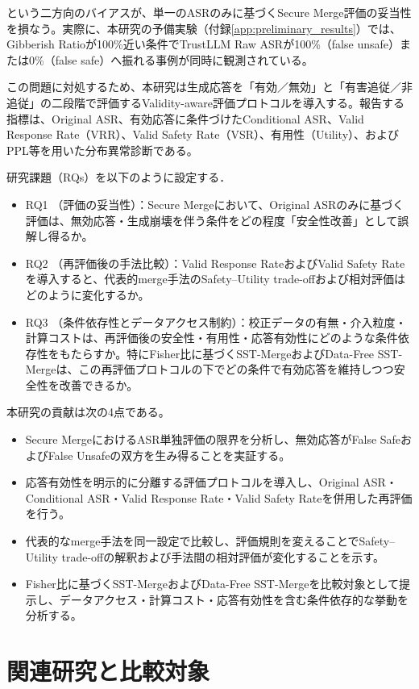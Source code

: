 \documentclass{article}
\begin{document}
という二方向のバイアスが、単一のASRのみに基づくSecure Merge評価の妥当性を損なう。実際に、本研究の予備実験（付録\ref{app:preliminary_results}）では、Gibberish Ratioが100\%近い条件でTrustLLM Raw ASRが100\%（false unsafe）または0\%（false safe）へ振れる事例が同時に観測されている。

この問題に対処するため、本研究は生成応答を「有効／無効」と「有害追従／非追従」の二段階で評価するValidity-aware評価プロトコルを導入する。報告する指標は、Original ASR、有効応答に条件づけたConditional ASR、Valid Response Rate（VRR）、Valid Safety Rate（VSR）、有用性（Utility）、およびPPL等を用いた分布異常診断である。

研究課題（RQs）を以下のように設定する．
\begin{itemize}
    \item RQ1 （評価の妥当性）：Secure Mergeにおいて、Original ASRのみに基づく評価は、無効応答・生成崩壊を伴う条件をどの程度「安全性改善」として誤解し得るか。
    \item RQ2 （再評価後の手法比較）：Valid Response RateおよびValid Safety Rateを導入すると、代表的merge手法のSafety–Utility trade-offおよび相対評価はどのように変化するか。
    \item RQ3 （条件依存性とデータアクセス制約）：校正データの有無・介入粒度・計算コストは、再評価後の安全性・有用性・応答有効性にどのような条件依存性をもたらすか。特にFisher比に基づくSST-MergeおよびData-Free SST-Mergeは、この再評価プロトコルの下でどの条件で有効応答を維持しつつ安全性を改善できるか。
\end{itemize}
本研究の貢献は次の4点である。
\begin{itemize}
    \item Secure MergeにおけるASR単独評価の限界を分析し、無効応答がFalse SafeおよびFalse Unsafeの双方を生み得ることを実証する。
    \item 応答有効性を明示的に分離する評価プロトコルを導入し、Original ASR・Conditional ASR・Valid Response Rate・Valid Safety Rateを併用した再評価を行う。
    \item 代表的なmerge手法を同一設定で比較し、評価規則を変えることでSafety–Utility trade-offの解釈および手法間の相対評価が変化することを示す。
    \item Fisher比に基づくSST-MergeおよびData-Free SST-Mergeを比較対象として提示し、データアクセス・計算コスト・応答有効性を含む条件依存的な挙動を分析する。
\end{itemize}

\section{関連研究と比較対象}
\end{document}
